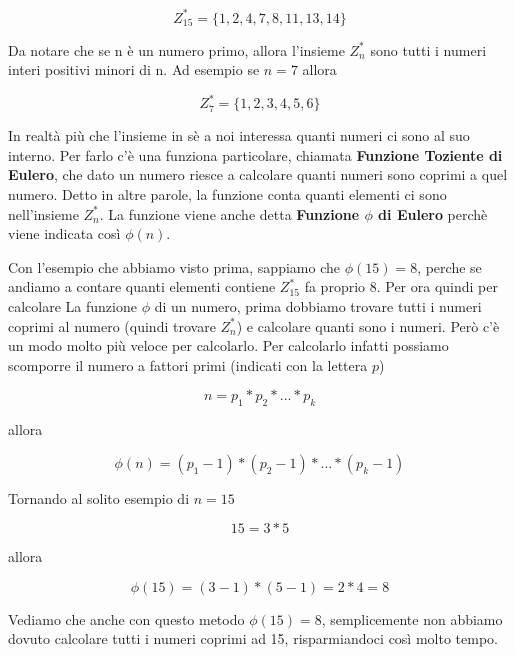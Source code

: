 \documentclass{rapport}
\begin{document}
\begin{equation*}
    Z_{15}^* = \{1, 2, 4, 7, 8, 11, 13, 14\}
\end{equation*}

Da notare che se n è un numero primo, allora l'insieme $Z_n^*$ sono tutti i numeri interi positivi minori di n. Ad esempio se $n=7$ allora 

\begin{equation*}
    Z_{7}^* = \{1, 2, 3, 4, 5, 6\}
\end{equation*}


In realtà più che l'insieme in sè a noi interessa quanti numeri ci sono al suo interno. Per farlo c'è una funziona particolare, chiamata \textbf{Funzione Toziente di Eulero}, che dato un numero riesce a calcolare quanti numeri sono coprimi a quel numero. Detto in altre parole, la funzione conta quanti elementi ci sono nell'insieme $Z_n^*$. La funzione viene anche detta \textbf{Funzione $\phi$ di Eulero} perchè viene indicata così $\phi(n)$.


Con l'esempio che abbiamo visto prima, sappiamo che $\phi(15) = 8$, perche se andiamo a contare quanti elementi contiene $Z_{15}^*$ fa proprio 8. Per ora quindi per calcolare La funzione $\phi$ di un numero, prima dobbiamo trovare tutti i numeri coprimi al numero (quindi trovare $Z_n^*$) e calcolare quanti sono i numeri. Però c'è un modo molto più veloce per calcolarlo. Per calcolarlo infatti possiamo scomporre il numero a fattori primi (indicati con la lettera $p$)

\begin{equation*}
    n = p_1 * p_2 * ... *p_k
\end{equation*}
 
 allora

 \begin{equation*}
    \phi(n) = (p_1 - 1) * (p_2 -1)  * ... * (p_k -1 )
\end{equation*}

Tornando al solito esempio di $n=15$


 \begin{equation*}
    15 = 3 * 5
\end{equation*}

allora


 \begin{equation*}
    \phi(15) = (3 - 1) * (5 -1)  = 2 *4 = 8
\end{equation*}

Vediamo che anche con questo metodo $\phi(15) = 8$, semplicemente non abbiamo dovuto calcolare tutti i numeri coprimi ad 15, risparmiandoci così molto tempo.
\end{document}
